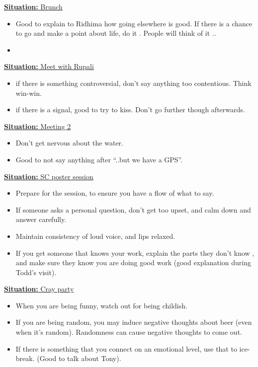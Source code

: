 \documentclass[11pt]{article}
\newcommand{\newSituation}[1]{\underline{\textbf{Situation:} #1} }
\begin{document}
\newSituation{Brunch} 
\begin{itemize} 
\item Good to explain to Ridhima how going elsewhere is good. If there is a chance to go and make a point about life, do it . People will think of it ..
\item 
\end{itemize} 

\newSituation{Meet with Rupali} 
\begin{itemize} 
\item if there is something controversial, don't say anything too contentious. Think win-win. 
\item if there is a signal, good to try to kiss. Don't go further though afterwards. 
\end{itemize}

\newSituation{Meeting 2} 
\begin{itemize} 
\item Don't get nervous about the water. 
\item Good to not say anything after ``..but we have a GPS''. 
\end{itemize} 

\newSituation{SC poster session} 
\begin{itemize} 
\item Prepare for the session, to ensure you have a flow of what to say. 
\item If someone asks a personal question, don't get too upset, and calm down and answer carefully. 
\item Maintain consistency of loud voice, and lips relaxed. 
\item If you get someone that knows your work, explain the parts they don't know , and make sure they know you are doing good work 
(good explanation during Todd's visit). 
\end{itemize} 

\newSituation{Cray party}
\begin{itemize} 
\item When you are being funny, watch out for being childish. 
\item If you are being random, you may induce negative thoughts about beer (even when it's random). Randomness can cause negative thoughts to come out. 
\item If there is something that you connect on an emotional level, use that to ice-break.  (Good to talk about Tony).  
\end{itemize} 
\end{document}

